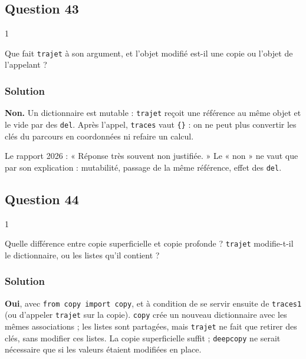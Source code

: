\documentclass[11pt,a4paper]{article}
\begin{document}
\hypertarget{question-43}{%
\subsection{Question 43}\label{question-43}}

\begin{indication}{1}

Que fait \texttt{trajet} à son argument, et l'objet modifié est-il une copie ou l'objet de l'appelant ?

\end{indication}

\hypertarget{solution-42}{%
\subsubsection{Solution}\label{solution-42}}

\textbf{Non.} Un dictionnaire est mutable : \texttt{trajet} reçoit une référence au même objet et le vide par des \texttt{del}. Après l'appel, \texttt{traces} vaut \texttt{\{\}} : on ne peut plus convertir les clés du parcours en coordonnées ni refaire un calcul.

\begin{jury}

Le rapport 2026 : « Réponse très souvent non justifiée. » Le « non » ne vaut que par son explication : mutabilité, passage de la même référence, effet des \texttt{del}.

\end{jury}

\hypertarget{question-44}{%
\subsection{Question 44}\label{question-44}}

\begin{indication}{1}

Quelle différence entre copie superficielle et copie profonde ? \texttt{trajet} modifie-t-il le dictionnaire, ou les listes qu'il contient ?

\end{indication}

\hypertarget{solution-43}{%
\subsubsection{Solution}\label{solution-43}}

\textbf{Oui}, avec \texttt{from\ copy\ import\ copy}, et à condition de se servir ensuite de \texttt{traces1} (ou d'appeler \texttt{trajet} sur la copie). \texttt{copy} crée un nouveau dictionnaire avec les mêmes associations ; les listes sont partagées, mais \texttt{trajet} ne fait que retirer des clés, sans modifier ces listes. La copie superficielle suffit ; \texttt{deepcopy} ne serait nécessaire que si les valeurs étaient modifiées en place.
\end{document}
